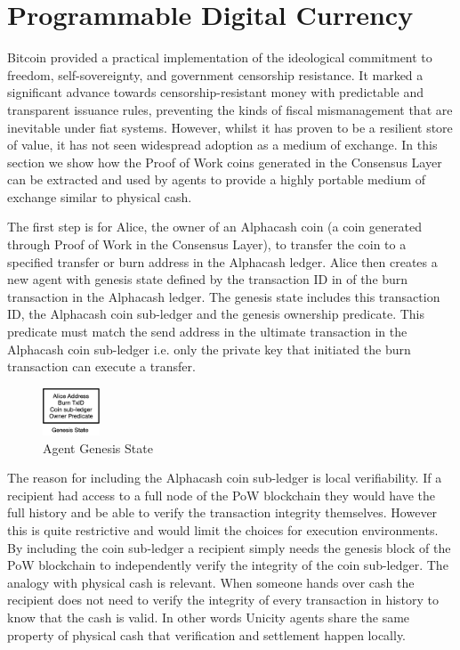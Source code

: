 \documentclass{article}
\begin{document}
\section{Programmable Digital Currency}

Bitcoin provided a practical implementation of the ideological commitment to freedom, self-sovereignty, and government censorship resistance.  It marked a significant advance towards censorship-resistant money with predictable and transparent issuance rules, preventing the kinds of fiscal mismanagement that are inevitable under fiat systems. However, whilst it has proven to be a resilient store of value, it has not seen widespread adoption as a medium of exchange. In this section we show how the Proof of Work coins generated in the Consensus Layer can be extracted and used by agents to provide a highly portable medium of exchange similar to physical cash.

\vspace{2mm}

The first step is for Alice, the owner of an Alphacash coin (a coin generated through Proof of Work in the Consensus Layer), to transfer the coin to a specified transfer or burn address in the Alphacash ledger. Alice then creates a new agent with genesis state defined by the transaction ID in of the burn transaction in the Alphacash ledger. The genesis state includes this transaction ID, the Alphacash coin sub-ledger and the genesis ownership predicate. This predicate must match the send address in the ultimate transaction in the Alphacash coin sub-ledger i.e. only the private key that initiated the burn transaction can execute a transfer.

\begin{figure}[htbp]
    \centering
    \includegraphics[width=0.15\textwidth]{CoinGenesis.png}
    \caption{Agent Genesis State}
    \label{fig:GenesisEvent}
\end{figure}

The reason for including the Alphacash coin sub-ledger is local verifiability. If a recipient had access to a full node of the PoW blockchain they would have the full history and be able to verify the transaction integrity themselves. However this is quite restrictive and would limit the choices for execution environments. By including the coin sub-ledger a recipient simply needs the genesis block of the PoW blockchain to independently verify the integrity of the coin sub-ledger. The analogy with physical cash is relevant. When someone hands over cash the recipient does not need to verify the integrity of every transaction in history to know that the cash is valid. In other words Unicity agents share the same property of physical cash that verification and settlement happen locally. 
\vspace{2mm}
\end{document}
